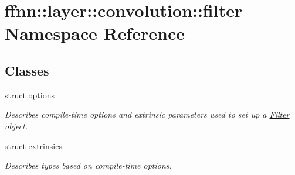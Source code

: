 \hypertarget{namespaceffnn_1_1layer_1_1convolution_1_1filter}{\section{ffnn\-:\-:layer\-:\-:convolution\-:\-:filter Namespace Reference}
\label{namespaceffnn_1_1layer_1_1convolution_1_1filter}
}
\subsection*{Classes}
\begin{DoxyCompactItemize}
\item 
struct \hyperlink{structffnn_1_1layer_1_1convolution_1_1filter_1_1options}{options}
\begin{DoxyCompactList}\small\item\em Describes compile-\/time options and extrinsic parameters used to set up a \hyperlink{classffnn_1_1layer_1_1convolution_1_1_filter}{Filter} object. \end{DoxyCompactList}\item 
struct \hyperlink{structffnn_1_1layer_1_1convolution_1_1filter_1_1extrinsics}{extrinsics}
\begin{DoxyCompactList}\small\item\em Describes types based on compile-\/time options. \end{DoxyCompactList}\end{DoxyCompactItemize}
